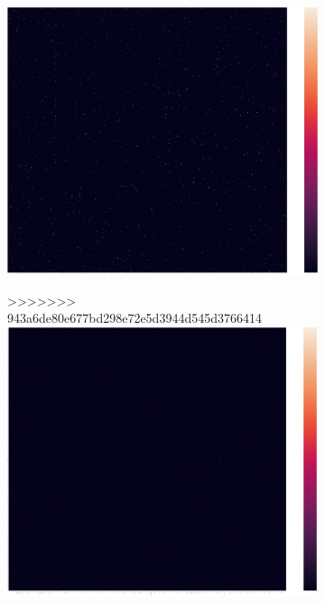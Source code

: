 \documentclass[12pt,%
               a4paper,%
               oneside,openany,%
               titlepage,%
               headinclude,footinclude,%
               BCOR5mm,%
               cleardoublepage=empty,%
               tablecaptionabove,%
               floatperchapter,
               ]{scrreprt}                 %
\begin{document}
\begin{figure}[ht]
\begin{minipage}[b]{0.5\linewidth}
\begin{figure}[ht]
\begin{minipage}[b]{0.5\linewidth}
\centering
\includegraphics[width=.9\linewidth]{Figures/Matrix_rareearth.jpg}
\vspace{4ex}
\end{minipage}
  \begin{minipage}[b]{0.5\linewidth}
>>>>>>> 943a6de80e677bd298e72e5d3944d545d3766414
    \centering
    \includegraphics[width=.9\linewidth]{Figures/Matrix_afghanistan.jpg}
    \vspace{4ex}
  \end{minipage} \\

\end{figure}
\end{minipage}
\end{figure}
\end{document}
